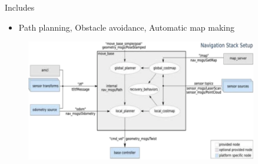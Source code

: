 \lyxframeend{}

Includes
\begin{itemize}
\item Path planning, Obstacle avoidance, Automatic map making
\end{itemize}
\noindent \begin{center}
\begin{figure}[H]
\noindent \centering{}\includegraphics[width=0.9\textwidth]{images/ROSNavigation}
\end{figure}

\par\end{center}


\lyxframeend{}


\lyxframeend{}

